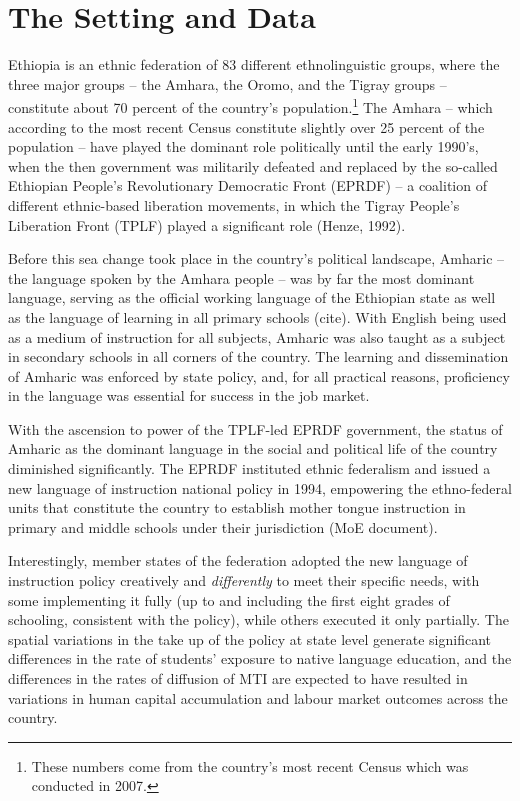 
\section{The Setting and Data}

Ethiopia is an ethnic federation of 83 different ethnolinguistic groups, where the three major groups – the Amhara, the Oromo, and the Tigray groups – constitute about 70 percent of the country’s population.\footnote{These numbers come from the country's most recent Census which was conducted in 2007.} The Amhara – which according to the most recent Census constitute slightly over 25 percent of the population – have played the dominant role politically until the early 1990’s, when the then government was militarily defeated and replaced by the so-called Ethiopian People’s Revolutionary Democratic Front (EPRDF) – a coalition of different ethnic-based liberation movements, in which the Tigray People’s Liberation Front (TPLF) played a significant role (Henze, 1992). 

Before this sea change took place in the country’s political landscape, Amharic – the language spoken by the Amhara people – was by far the most dominant language, serving as the official working language of the Ethiopian state as well as the language of learning in all primary schools (cite). With English being used as a medium of instruction for all subjects, Amharic was also taught as a subject in secondary schools in all corners of the country. The learning and dissemination of Amharic was enforced by state policy, and, for all practical reasons, proficiency in the language was essential for success in the job market.

With the ascension to power of the TPLF-led EPRDF government, the status of Amharic as the dominant language in the social and political life of the country diminished significantly. The EPRDF instituted ethnic federalism and issued a new language of instruction national policy in 1994, empowering the ethno-federal units that constitute the country to establish mother tongue instruction in primary and middle schools under their jurisdiction (MoE document). 

Interestingly, member states of the federation adopted the new language of instruction policy creatively and \emph{differently} to meet their specific needs, with some implementing it fully (up to and including the first eight grades of schooling, consistent with the policy), while others executed it only partially. The spatial variations in the take up of the policy at state level generate significant differences in the rate of students’ exposure to native language education, and the differences in the rates of diffusion of MTI are expected to have resulted in variations in human capital accumulation and labour market outcomes across the country. 

